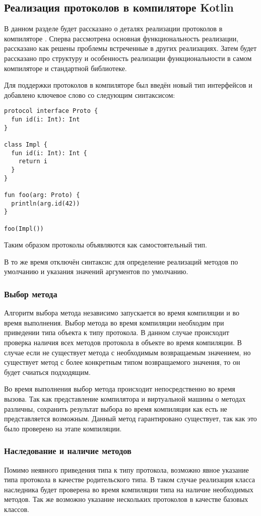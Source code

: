 \subsection{Реализация протоколов в компиляторе Kotlin}
В данном разделе будет рассказано о деталях реализации протоколов в компиляторе . Сперва рассмотрена основная функциональность реализации, рассказано как решены проблемы встреченные в других реализациях. Затем будет рассказано про структуру и особенность реализации функциональности в самом компиляторе и стандартной библиотеке.

Для поддержки протоколов в компиляторе был введён новый тип интерфейсов и добавлено ключевое слово  со следующим синтаксисом:

\begin{verbatim}
protocol interface Proto {
  fun id(i: Int): Int
}

class Impl {
  fun id(i: Int): Int {
    return i
  }
}

fun foo(arg: Proto) {
  println(arg.id(42))
}

foo(Impl())
\end{verbatim}

Таким образом протоколы объявляются как самостоятельный тип.

В то же время отключён синтаксис для определение реализаций методов по умолчанию и указания значений аргументов по умолчанию.

\subsubsection{Выбор метода}
Алгоритм выбора метода независимо запускается во время компиляции и во время выполнения. Выбор метода во время компиляции необходим при приведении типа объекта к типу протокола. В данном случае происходит проверка наличия всех методов протокола в объекте во время компиляции. В случае если не существует метода с необходимым возвращаемым значением, но существует метод с более конкретным типом возвращаемого значения, то он будет счиаться подходящим.

Во время выполнения выбор метода происходит непосредственно во время вызова. Так как представление компилятора и виртуальной машины о методах различны, сохранить результат выбора во время компиляции как есть не представляется возможным. Данный метод гарантировано существует, так как это было проверено на этапе компиляции.

\subsubsection{Наследование и наличие методов}
Помимо неявного приведения типа к типу протокола, возможно явное указание типа протокола в качестве родительского типа. В таком случае реализация класса наследника будет проверена во время компиляции типа на наличие необходимых методов. Так же возможно указание нескольких протоколов в качестве базовых классов.

